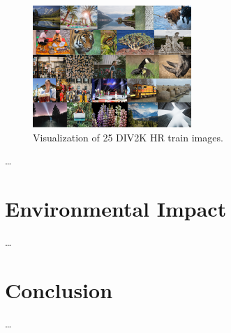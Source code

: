 \documentclass{article}
\begin{document}
{    \begin{figure}[ht]
        \centering
        \includegraphics[width=6cm]{images/DIV2K_HR.png}
        \caption{Visualization of 25 DIV2K HR train images.}
        \label{fig:div2k-train-og}
    \end{figure}


    …
}

{
    \section{Environmental Impact}
    \label{sec:env-impact}

    …
}

{
    \section{Conclusion}
    \label{sec:conclusion}

    …
}

{
    
}
\end{document}
